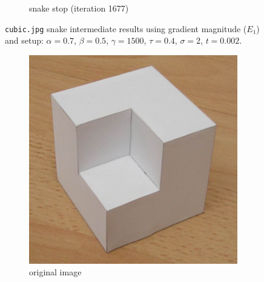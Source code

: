 \documentclass[11pt,a4paper]{article}
\begin{document}
\begin{figure}[H]
\begin{subfigure}[t]{0.24\textwidth}
        \caption{snake stop (iteration 1677)}
        \label{fig:cubic_end}
    \end{subfigure}
    \caption{\texttt{cubic.jpg} snake intermediate results using gradient
    magnitude ($E_1$) and setup: $\alpha
= 0.7$, $\beta = 0.5$, $\gamma = 1500$, $\tau = 0.4$, $\sigma = 2$, $t = 0.002$.}
    \label{fig:cubic_intermediate}
\end{figure}

\begin{figure}[H]
    \centering
    \begin{subfigure}[t]{0.24\textwidth}
        \includegraphics[width=\textwidth]{src/images/cubic_shape01.jpg}
        \caption{original image}
        \label{fig:cubic_log_original}
    \end{subfigure}
    \begin{subfigure}[t]{0.24\textwidth}

\end{subfigure}
\end{figure}
\end{document}
